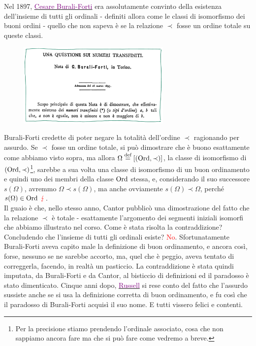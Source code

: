 \begin{note}
	Nel 1897, \href{https://it.wikipedia.org/wiki/Cesare_Burali-Forti}{\textcolor{purple}{Cesare Burali-Forti}} era assolutamente convinto della esistenza dell'insieme
	di tutti gli ordinali - definiti allora come le classi di isomorfismo dei buoni ordini - quello che non sapeva è se la relazione $\prec$ fosse un ordine totale su queste classi.
	\begin{figure}[H]
		\centering
		\includegraphics[width = 7.5cm]{immagini/Burali_Forti.png}
	\end{figure}
	Burali-Forti credette di poter negare la totalità dell'ordine $\prec$ ragionando per assurdo. Se $\prec$ fosse un ordine totale, si può dimostrare che è buono esattamente come abbiamo visto sopra, ma 
	allora $\Omega \overset{\text{def}}{=} [(\operatorname{Ord},\prec)]$, la classe di isomorfismo di $(\operatorname{Ord},\prec)$\footnote{Per la precisione stiamo prendendo l'ordinale associato, cosa che non sappiamo ancora fare ma che si può fare come vedremo a breve.},
	sarebbe a sua volta una classe di isomorfismo di un buon ordinamento e quindi uno dei membri della classe $\operatorname{Ord}$ stessa,
	e, considerando il suo successore $s(\Omega)$, avremmo $\Omega \prec s(\Omega)$, ma anche ovviamente $s(\Omega) \prec \Omega$, perché $s(\Omega) \in \operatorname{Ord}\;\textcolor{red}\lightning$.\\
	Il guaio è che, nello stesso anno, Cantor pubblicò una dimostrazione del fatto che la relazione $\prec$ è totale - esattamente l'argomento dei segmenti iniziali isomorfi che abbiamo illustrato 
	nel corso. Come è stata risolta la contraddizione? Concludendo che l'insieme di tutti gli ordinali esiste? \textcolor{red}{No}. Sfortunatamente Burali-Forti 
	aveva capito male la definizione di buon ordinamento, e ancora così, forse, nessuno se ne sarebbe accorto, ma, quel che è peggio, aveva tentato di correggerla, facendo, in realtà un pasticcio.
	La contraddizione è stata quindi imputata, da Burali-Forti e da Cantor, al bisticcio di definizioni ed il paradosso è stato dimenticato. Cinque anni dopo, \href{https://en.wikipedia.org/wiki/Bertrand_Russell}{\textcolor{purple}{Russell}}
	si rese conto del fatto che l'assurdo sussiste anche se si usa la definizione corretta di buon ordinamento, e fu così che il paradosso di Burali-Forti acquisì il suo nome. E tutti vissero felici e contenti.
\end{note}

